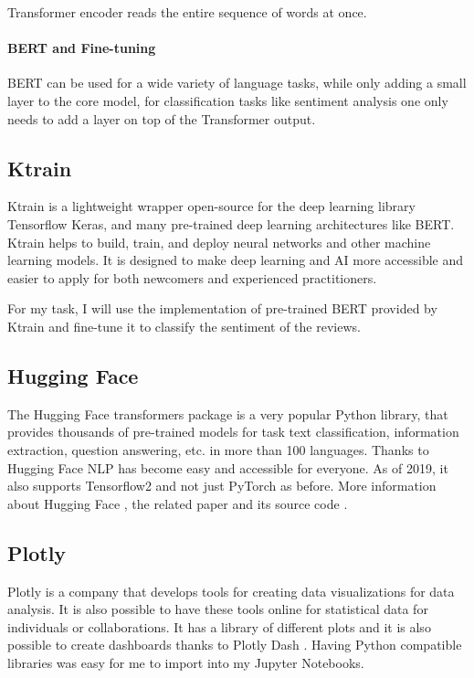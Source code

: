 Transformer encoder reads the entire sequence of words at once. 

\paragraph{\gls{BERT} and Fine-tuning} \gls{BERT} can be used for a wide variety of language tasks, while only adding a small layer to the core model, for classification tasks like sentiment analysis one only needs to add a layer on top of the Transformer output.

\subsection{Ktrain}
\gls{Ktrain} \cite{maiya_amaiyaktrain_2021} is a lightweight wrapper open-source for the deep learning library \gls{Tensorflow} \gls{Keras}, and many pre-trained deep learning architectures like \gls{BERT}.
\gls{Ktrain} helps to build, train, and deploy neural networks and other machine learning models. 
It is designed to make deep learning and AI more accessible and easier to apply for both newcomers and experienced practitioners.

For my task, I will use the implementation of pre-trained \gls{BERT} provided by \gls{Ktrain} and fine-tune it to classify the sentiment of the reviews.


\subsection{Hugging Face}
The \gls{Hugging Face} transformers package is a very popular Python library, that provides thousands of pre-trained models for task text classification, information extraction, question answering, etc. in more than 100 languages.
Thanks to \gls{Hugging Face} NLP has become easy and accessible for everyone.
As of 2019, it also supports Tensorflow2 and not just PyTorch \cite{noauthor_pytorch_nodate} as before.
More information about Hugging Face \cite{noauthor_hugging_nodate}, the related paper \cite{wolf-etal-2020-transformers} and its source code \cite{noauthor_huggingfacetransformers_2021}.

\subsection{Plotly}
\gls{Plotly} \cite{noauthor_plotly_nodate} is a company that develops tools for creating data visualizations for data analysis.
It is also possible to have these tools online for statistical data for individuals or collaborations.
It has a library of different plots \cite{noauthor_plotly_nodate-1} and it is also possible to create dashboards thanks to \gls{Plotly} Dash \cite{noauthor_dash_nodate}.
Having Python compatible libraries was easy for me to import into my Jupyter Notebooks.